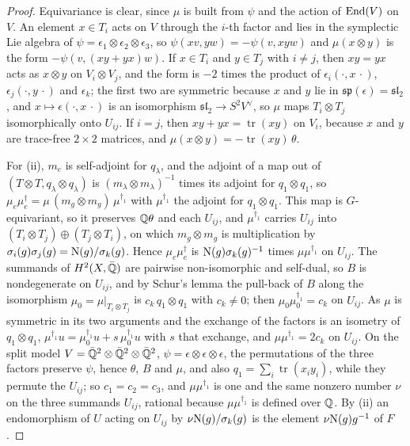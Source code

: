 \begin{proof}
Equivariance is clear, since $\mu$ is built from $\psi$ and the action of
$\operatorname{End}(V)$ on $V$. An element $x\in T_{i}$ acts on $V$ through the $i$-th factor
and lies in the symplectic Lie algebra of $\psi=\epsilon_{1}\otimes
\epsilon_{2}\otimes\epsilon_{3}$, so $\psi(xv,yw)=-\psi(v,xyw)$ and
$\mu(x\otimes y)$ is the form $-\psi(v,(xy+yx)w)$. If $x\in T_{i}$ and
$y\in T_{j}$ with $i\ne j$, then $xy=yx$ acts as $x\otimes y$ on
$V_{i}\otimes V_{j}$, and the form is $-2$ times the product of
$\epsilon_{i}(\cdot,x\,\cdot)$, $\epsilon_{j}(\cdot,y\,\cdot)$ and
$\epsilon_{k}$; the first two are symmetric because $x$ and $y$ lie in
$\mathfrak{sp}(\epsilon)=\mathfrak{sl}_{2}$, and $x\mapsto\epsilon(\cdot,x\,\cdot)$
is an isomorphism $\mathfrak{sl}_{2}\to S^{2}V^{\vee}$, so $\mu$ maps
$T_{i}\otimes T_{j}$ isomorphically onto $U_{ij}$. If $i=j$, then
$xy+yx=\operatorname{tr}(xy)$ on $V_{i}$, because $x$ and $y$ are trace-free
$2\times2$ matrices, and $\mu(x\otimes y)=-\operatorname{tr}(xy)\,\theta$.

For (ii), $m_{e}$ is self-adjoint for $q_{\lambda}$, and the adjoint of a
map out of $(T\otimes T,q_{\lambda}\otimes q_{\lambda})$ is
$(m_{\lambda}\otimes m_{\lambda})^{-1}$ times its adjoint for
$q_{1}\otimes q_{1}$, so
$\mu_{e}\mu_{e}^{\dagger}=\mu\,(m_{g}\otimes m_{g})\,\mu^{\dagger_{1}}$ with
$\mu^{\dagger_{1}}$ the adjoint for $q_{1}\otimes q_{1}$. This map is
$G$-equivariant, so it preserves $\mathbb{Q}\theta$ and each $U_{ij}$, and
$\mu^{\dagger_{1}}$ carries $U_{ij}$ into
$(T_{i}\otimes T_{j})\oplus(T_{j}\otimes T_{i})$, on which $m_{g}\otimes m_{g}$
is multiplication by $\sigma_{i}(g)\sigma_{j}(g)=\mathrm{N}(g)/\sigma_{k}(g)$. Hence
$\mu_{e}\mu_{e}^{\dagger}$ is $\mathrm{N}(g)\sigma_{k}(g)^{-1}$ times
$\mu\mu^{\dagger_{1}}$ on $U_{ij}$. The summands of $H^{2}(X,\bar{\mathbb{Q}})$ are
pairwise non-isomorphic and self-dual, so $B$ is nondegenerate on $U_{ij}$,
and by Schur's lemma the pull-back of $B$ along the isomorphism
$\mu_{0}=\mu|_{T_{i}\otimes T_{j}}$ is $c_{k}\,q_{1}\otimes q_{1}$ with
$c_{k}\ne0$; then $\mu_{0}\mu_{0}^{\dagger_{1}}=c_{k}$ on $U_{ij}$. As $\mu$
is symmetric in its two arguments and the exchange of the factors is an
isometry of $q_{1}\otimes q_{1}$, $\mu^{\dagger_{1}}u=\mu_{0}^{\dagger_{1}}u+
s\,\mu_{0}^{\dagger_{1}}u$ with $s$ that exchange, and $\mu\mu^{\dagger_{1}}=2c_{k}$
on $U_{ij}$. On the split model $V=\bar{\mathbb{Q}}^{2}\otimes\bar{\mathbb{Q}}^{2}\otimes
\bar{\mathbb{Q}}^{2}$, $\psi=\epsilon\otimes\epsilon\otimes\epsilon$, the
permutations of the three factors preserve $\psi$, hence $\theta$, $B$ and
$\mu$, and also $q_{1}=\sum_{i}\operatorname{tr}(x_{i}y_{i})$, while they
permute the $U_{ij}$; so $c_{1}=c_{2}=c_{3}$, and $\mu\mu^{\dagger_{1}}$ is one
and the same nonzero number $\nu$ on the three summands $U_{ij}$, rational
because $\mu\mu^{\dagger_{1}}$ is defined over $\mathbb{Q}$. By (ii) an endomorphism of $U$ acting
on $U_{ij}$ by $\nu\mathrm{N}(g)/\sigma_{k}(g)$ is the element $\nu\mathrm{N}(g)g^{-1}$ of
$F$.
\end{proof}

